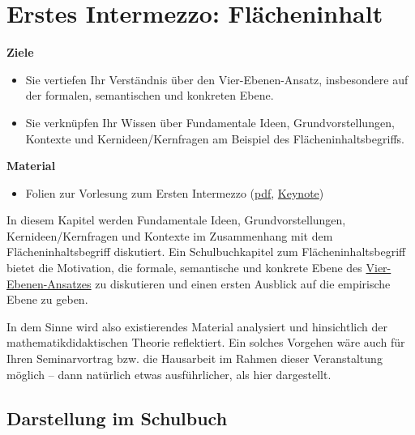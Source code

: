 \documentclass[
]{scrbook}
\providecommand{\tightlist}{%
  \setlength{\itemsep}{0pt}\setlength{\parskip}{0pt}}
\renewenvironment{quote}{
  \list{}{
	\leftmargin0.2cm   %
    \rightmargin\leftmargin
      	\def\FrameCommand
    {%
        {\color{quoteColor}\vrule width 2pt}%
        \hspace{0pt}%
    }%
    \MakeFramed{\advance \hsize -\width \FrameRestore}    \color{quoteColor}
    }
  \item\relax
}
{\endlist\color{black}\endMakeFramed}
\theoremstyle{definition}
\theoremstyle{definition}
\theoremstyle{definition}
\theoremstyle{definition}
\theoremstyle{remark}
\begin{document}
\hypertarget{erstes-intermezzo-flaecheninhalt}{%
\chapter{Erstes Intermezzo: Flächeninhalt}\label{erstes-intermezzo-flaecheninhalt}}

\begin{quote}
\textbf{Ziele}

\begin{itemize}
\tightlist
\item
  Sie vertiefen Ihr Verständnis über den Vier-Ebenen-Ansatz, insbesondere auf der formalen, semantischen und konkreten Ebene.
\item
  Sie verknüpfen Ihr Wissen über Fundamentale Ideen, Grundvorstellungen, Kontexte und Kernideen/Kernfragen am Beispiel des Flächeninhaltsbegriffs.
\end{itemize}

\textbf{Material}

\begin{itemize}
\tightlist
\item
  Folien zur Vorlesung zum Ersten Intermezzo (\href{files/Stoffdidaktik-WiSe2223-Kap5.pdf}{pdf}, \href{files/Stoffdidaktik-WiSe2223-Kap5.key}{Keynote})
\end{itemize}
\end{quote}

In diesem Kapitel werden Fundamentale Ideen, Grundvorstellungen, Kernideen/Kernfragen und Kontexte im Zusammenhang mit dem Flächeninhaltsbegriff diskutiert. Ein Schulbuchkapitel zum Flächeninhaltsbegriff bietet die Motivation, die \textcolor{formalColor}{formale}, \textcolor{semanticColor}{semantische} und \textcolor{concreteColor}{konkrete} Ebene des \protect\hyperlink{tab:fragen-ebenen}{Vier-Ebenen-Ansatzes} zu diskutieren und einen ersten Ausblick auf die \textcolor{empiricColor}{empirische} Ebene zu geben.

In dem Sinne wird also existierendes Material analysiert und hinsichtlich der mathematikdidaktischen Theorie reflektiert. Ein solches Vorgehen wäre auch für Ihren Seminarvortrag bzw. die Hausarbeit im Rahmen dieser Veranstaltung möglich -- dann natürlich etwas ausführlicher, als hier dargestellt.

\hypertarget{darstellung-im-schulbuch}{%
\section{Darstellung im Schulbuch}\label{darstellung-im-schulbuch}}
\end{document}
